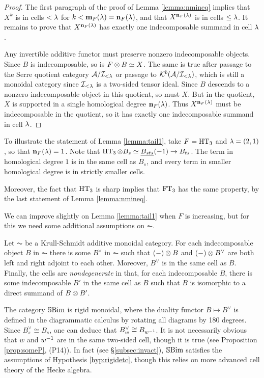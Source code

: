 \begin{proof} The first paragraph of the proof of Lemma \ref{lemma:nmineq} implies that $X^k$ is in cells $<\lambda$ for $k < {\mathbf m}_F(\lambda) = {\mathbf n}_F(\lambda)$, and that $X^{{\mathbf n}_F(\lambda)}$ is in cells $\le
\lambda$. It remains to prove that $X^{{\mathbf n}_F(\lambda)}$ has exactly one indecomposable summand in cell $\lambda$.

Any invertible additive functor must preserve nonzero indecomposable objects. Since $B$ is indecomposable, so is $F \otimes B \simeq X$. The same is true after passage to the Serre quotient
category ${\mathcal{A}}/{\mathcal{I}}_{< \lambda}$ or passage to ${\mathcal{K}}^b({\mathcal{A}}/{\mathcal{I}}_{<\lambda})$, which is still a monoidal category since ${\mathcal{I}}_{< \lambda}$ is a two-sided tensor ideal. Since $B$ descends to a nonzero indecomposable object in this quotient, so
must $X$. But in the quotient, $X$ is supported in a single homological degree ${\mathbf n}_F(\lambda)$. Thus $X^{{\mathbf n}_F(\lambda)}$ must be indecomposable in the quotient, so it has exactly one
indecomposable summand in cell $\lambda$. \end{proof}

\begin{example}
To illustrate the statement of Lemma \ref{lemma:tail1}, take  $F=\operatorname{HT}_3$ and $\lambda=(2,1)$, so that ${\mathbf n}_F(\lambda)=1$.  Note that $\operatorname{HT}_3\otimes B_s \simeq \underline{B_{sts}}(-1)\rightarrow B_{ts}$. The term in homological degree $1$ is in the same cell as $B_s$, and every term in smaller homological degree is in strictly smaller cells.

Moreover, the fact that $\operatorname{HT}_3$ is sharp implies that $\operatorname{FT}_3$ has the same property, by the last statement of Lemma \ref{lemma:nmineq}.
\end{example}

We can improve slightly on Lemma \ref{lemma:tail1} when $F$ is increasing, but for this we need some additional assumptions on $\AC$.

\begin{hypothesis}\label{hyp:rigidetc}
Let $\AC$ be a Krull-Schmidt additive monoidal category. For each indecomposable object $B$ in $\AC$ there is some $B^\vee$ in $\AC$ such that $(-) \otimes B$ and $(-) \otimes B^\vee$ are both left and right adjoint to each other. Moreover, $B^\vee$ is in the same cell as $B$. Finally, the cells are \emph{nondegenerate} in that, for each indecomposable $B$, there is some indecomposable $B'$ in the same cell as $B$ such that $B$ is isomorphic to a direct summand of $B \otimes B'$. \end{hypothesis}


\begin{remark} \label{rmk:rigidmonoidal} The category ${\mathbb{S}}{\rm Bim }$ is rigid monoidal, where the duality functor $B\mapsto B^\vee$ is defined in the diagrammatic calculus by rotating all diagrams by 180 degrees. Since $B_s^\vee \cong
B_s$, one can deduce that $B_w^\vee \cong B_{w^{-1}}$. It is not necessarily obvious that $w$ and $w^{-1}$ are in the same two-sided cell, though it is true (see Proposition \ref{prop:someP}, (P14)).   In fact (see \S\ref{subsec:invact}), ${\mathbb{S}}{\rm Bim }$ satisfies the assumptions of Hypothesis \ref{hyp:rigidetc}, though this relies on more advanced cell theory of the Hecke algebra. \end{remark}

